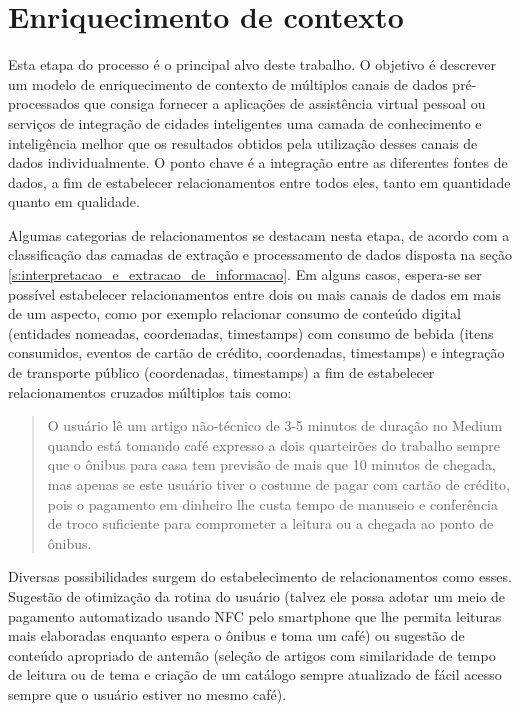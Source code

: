 \chapter{Enriquecimento de contexto}

Esta etapa do processo é o principal alvo deste trabalho. O objetivo é descrever um modelo de enriquecimento de contexto de múltiplos canais de dados pré-processados que consiga fornecer a aplicações de assistência virtual pessoal ou serviços de integração de cidades inteligentes uma camada de conhecimento e inteligência melhor que os resultados obtidos pela utilização desses canais de dados individualmente. O ponto chave é a integração entre as diferentes fontes de dados, a fim de estabelecer relacionamentos entre todos eles, tanto em quantidade quanto em qualidade.

Algumas categorias de relacionamentos se destacam nesta etapa, de acordo com a classificação das camadas de extração e processamento de dados disposta na seção \ref{s:interpretacao_e_extracao_de_informacao}. Em alguns casos, espera-se ser possível estabelecer relacionamentos entre dois ou mais canais de dados em mais de um aspecto, como por exemplo relacionar consumo de conteúdo digital (entidades nomeadas, coordenadas, timestamps) com consumo de bebida (itens consumidos, eventos de cartão de crédito, coordenadas, timestamps) e integração de transporte público (coordenadas, timestamps) a fim de estabelecer relacionamentos cruzados múltiplos tais como:
\begin{quote}
    O usuário lê um artigo não-técnico de 3-5 minutos de duração no Medium quando está tomando café expresso a dois quarteirões do trabalho sempre que o ônibus para casa tem previsão de mais que 10 minutos de chegada, mas apenas se este usuário tiver o costume de pagar com cartão de crédito, pois o pagamento em dinheiro lhe custa tempo de manuseio e conferência de troco suficiente para comprometer a leitura ou a chegada ao ponto de ônibus.
\end{quote}

Diversas possibilidades surgem do estabelecimento de relacionamentos como esses. Sugestão de otimização da rotina do usuário (talvez ele possa adotar um meio de pagamento automatizado usando NFC pelo smartphone que lhe permita leituras mais elaboradas enquanto espera o ônibus e toma um café) ou sugestão de conteúdo apropriado de antemão (seleção de artigos com similaridade de tempo de leitura ou de tema e criação de um catálogo sempre atualizado de fácil acesso sempre que o usuário estiver no mesmo café).

